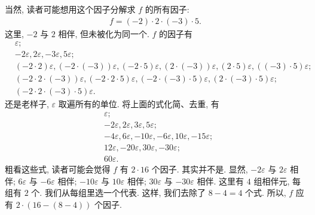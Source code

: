 \begin{example}
    当然, 读者可能想用这个因子分解求 $f$ 的所有因子:
    \begin{align*}
        f = (-2) \cdot 2 \cdot (-3) \cdot 5.
    \end{align*}
    这里, $-2$ 与 $2$ 相伴, 但未被化为同一个. $f$ 的因子有
    \begin{align*}
         & \varepsilon;                                                                                                                                                \\
         & -2\varepsilon, 2\varepsilon, -3\varepsilon, 5\varepsilon;                                                                                                   \\
         & (-2 \cdot 2)\varepsilon, (-2 \cdot (-3))\varepsilon, (-2 \cdot 5)\varepsilon, (2 \cdot (-3))\varepsilon, (2 \cdot 5)\varepsilon, ((-3) \cdot 5)\varepsilon; \\
         & (-2 \cdot 2 \cdot (-3))\varepsilon, (-2 \cdot 2 \cdot 5)\varepsilon, (-2 \cdot (-3) \cdot 5)\varepsilon, (2 \cdot (-3) \cdot 5)\varepsilon;                 \\
         & (-2 \cdot 2 \cdot (-3) \cdot 5)\varepsilon.
    \end{align*}
    还是老样子, $\varepsilon$ 取遍所有的单位. 将上面的式化简、去重, 有
    \begin{align*}
         & \varepsilon;                                                                               \\
         & -2\varepsilon, 2\varepsilon, 3\varepsilon, 5\varepsilon;                                   \\
         & -4\varepsilon, 6\varepsilon, -10\varepsilon, -6\varepsilon, 10\varepsilon, -15\varepsilon; \\
         & 12\varepsilon, -20\varepsilon, 30\varepsilon, -30\varepsilon;                              \\
         & 60\varepsilon.
    \end{align*}
    粗看这些式, 读者可能会觉得 $f$ 有 $2 \cdot 16$ 个因子. 其实并不是. 显然, $-2\varepsilon$ 与 $2\varepsilon$ 相伴; $6\varepsilon$ 与 $-6\varepsilon$ 相伴; $-10\varepsilon$ 与 $10\varepsilon$ 相伴; $30\varepsilon$ 与 $-30\varepsilon$ 相伴. 这里有 $4$ 组相伴元, 每组有 $2$ 个. 我们从每组里选一个代表. 这样, 我们去除了 $8 - 4 = 4$ 个式. 所以, $f$ 应有 $2 \cdot (16 - (8 - 4))$ 个因子.
\end{example}

